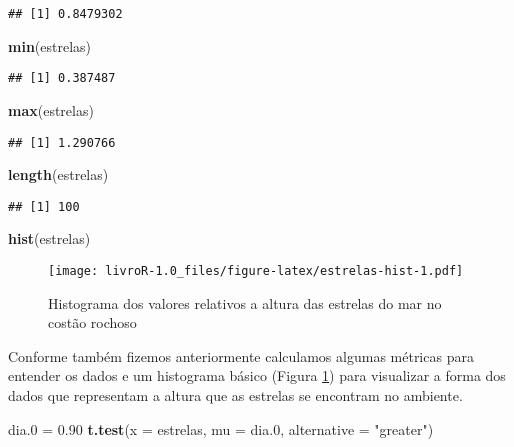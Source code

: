 \documentclass[titlepage, oneside, openany, a4paper]{book}
\newenvironment{Shaded}{\begin{snugshade}}{\end{snugshade}}
\newcommand{\DataTypeTok}[1]{\textcolor[rgb]{0.13,0.29,0.53}{#1}}
\newcommand{\FloatTok}[1]{\textcolor[rgb]{0.00,0.00,0.81}{#1}}
\newcommand{\KeywordTok}[1]{\textcolor[rgb]{0.13,0.29,0.53}{\textbf{#1}}}
\newcommand{\NormalTok}[1]{#1}
\newcommand{\StringTok}[1]{\textcolor[rgb]{0.31,0.60,0.02}{#1}}
\begin{document}
\begin{verbatim}
## [1] 0.8479302
\end{verbatim}

\begin{Shaded}
\begin{Highlighting}[]
\KeywordTok{min}\NormalTok{(estrelas)}
\end{Highlighting}
\end{Shaded}

\begin{verbatim}
## [1] 0.387487
\end{verbatim}

\begin{Shaded}
\begin{Highlighting}[]
\KeywordTok{max}\NormalTok{(estrelas)}
\end{Highlighting}
\end{Shaded}

\begin{verbatim}
## [1] 1.290766
\end{verbatim}

\begin{Shaded}
\begin{Highlighting}[]
\KeywordTok{length}\NormalTok{(estrelas)}
\end{Highlighting}
\end{Shaded}

\begin{verbatim}
## [1] 100
\end{verbatim}

\begin{Shaded}
\begin{Highlighting}[]
\KeywordTok{hist}\NormalTok{(estrelas)}
\end{Highlighting}
\end{Shaded}

\begin{figure}
\centering
\texttt{[image: livroR-1.0\_files/figure-latex/estrelas-hist-1.pdf]}
\caption{\label{fig:estrelas-hist}Histograma dos valores relativos a altura das estrelas do mar no costão rochoso}
\end{figure}

Conforme também fizemos anteriormente calculamos algumas métricas para entender os dados e um histograma básico (Figura \ref{fig:estrelas-hist}) para visualizar a forma dos dados que representam a altura que as estrelas se encontram no ambiente.

\begin{Shaded}
\begin{Highlighting}[]
\NormalTok{dia}\FloatTok{.0}\NormalTok{ =}\StringTok{ }\FloatTok{0.90}
\KeywordTok{t.test}\NormalTok{(}\DataTypeTok{x =}\NormalTok{ estrelas, }\DataTypeTok{mu =}\NormalTok{ dia}\FloatTok{.0}\NormalTok{, }\DataTypeTok{alternative =} \StringTok{"greater"}\NormalTok{)}
\end{Highlighting}
\end{Shaded}
\end{document}
